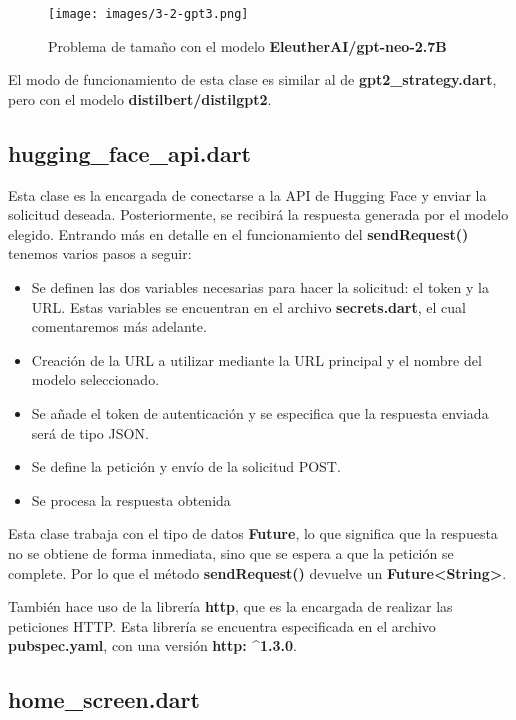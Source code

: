 \documentclass[12pt]{article}
\begin{document}
\begin{figure}[H]
    \centering
    \texttt{[image: images/3-2-gpt3.png]}
    \caption{Problema de tamaño con el modelo \textbf{EleutherAI/gpt-neo-2.7B}}
    \label{fig:3-2-gpt3}
\end{figure}

El modo de funcionamiento de esta clase es similar al de \textbf{gpt2\_strategy.dart}, pero con el modelo \textbf{distilbert/distilgpt2}.

\subsection{hugging\_face\_api.dart}

Esta clase es la encargada de conectarse a la API de Hugging Face y enviar la solicitud deseada. Posteriormente, se recibirá la respuesta generada por el modelo elegido. Entrando más en detalle en el funcionamiento del \textbf{sendRequest()} tenemos varios pasos a seguir:

\begin{itemize}
    \item Se definen las dos variables necesarias para hacer la solicitud: el token y la URL. Estas variables se encuentran en el archivo \textbf{secrets.dart}, el cual comentaremos más adelante.
    \item Creación de la URL a utilizar mediante la URL principal y el nombre del modelo seleccionado.
    \item Se añade el token de autenticación y se especifica que la respuesta enviada será de tipo JSON.
    \item Se define la petición y envío de la solicitud POST.
    \item Se procesa la respuesta obtenida
\end{itemize}

Esta clase trabaja con el tipo de datos \textbf{Future}, lo que significa que la respuesta no se obtiene de forma inmediata, sino que se espera a que la petición se complete. Por lo que el método \textbf{sendRequest()} devuelve un \textbf{Future<String>}.

También hace uso de la librería \textbf{http}, que es la encargada de realizar las peticiones HTTP. Esta librería se encuentra especificada en el archivo \textbf{pubspec.yaml}, con una versión \textbf{http: \^{}1.3.0}.

\subsection{home\_screen.dart}
\end{document}
